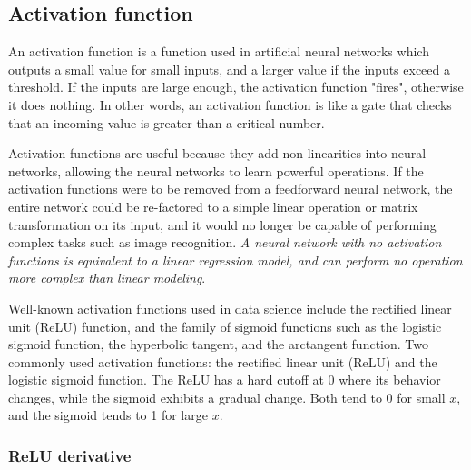 \documentclass[11pt]{article}
\begin{document}
\subsection{Activation function} 

An activation function is a function used in artificial neural networks which outputs a small value for small inputs, and a larger value if the 
inputs exceed a threshold. If the inputs are large enough, the activation function "fires", 
otherwise it does nothing. In other words, an activation function is like a gate 
that checks that an incoming value is greater than a critical number.

Activation functions are useful because they add non-linearities into neural networks, 
allowing the neural networks to learn powerful operations. 
If the activation functions were to be removed from a feedforward neural network, 
the entire network could be re-factored to a simple linear operation or matrix transformation on its input, 
and it would no longer be capable of performing complex tasks such as image recognition.
\emph{A neural network with no activation functions is equivalent to a linear regression model, and can perform no operation more complex than linear modeling}.

Well-known activation functions used in data science include the rectified linear unit (ReLU) function, 
and the family of sigmoid functions such as the logistic sigmoid function, 
the hyperbolic tangent, and the arctangent function.
Two commonly used activation functions: the rectified linear unit (ReLU) and the logistic sigmoid function. The ReLU has a hard cutoff at 0 where 
its behavior changes, while the sigmoid exhibits a gradual change. Both tend to 0 for small $x$, and the sigmoid tends to 1 for large $x$.

\subsubsection{ReLU derivative} 
\end{document}
